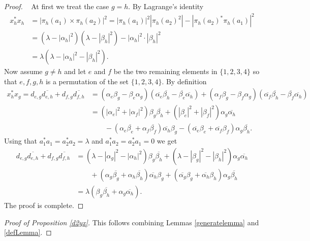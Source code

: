 \documentclass[11pt]{amsart}
\theoremstyle{definition}
\theoremstyle{remark}
\begin{document}
\begin{proof}~
At first we treat the case $g=h$. By Lagrange's identity
\begin{align*}
x_h^*x_h 
&=|\pi_h(a_1)\times \pi_h(a_2)|^2=|\pi_h(a_1)|^2|\pi_h(a_2)^2|-|\pi_h(a_2)^*\pi_h(a_1)|^2\\ &=
(\lambda-|\alpha_h|^2)(\lambda-|\beta_h|^2)-|\alpha_h|^2\cdot|\beta_h|^2\\ &=\lambda(\lambda-|\alpha_h|^2-|\beta_h|^2).
\end{align*} 
Now assume $g\neq h$ and let $e$ and $f$ be the two remaining elements in $\{1,2,3,4\}$ so that $e,f,g,h$ is a permutation of the set $\{1,2,3,4\}$. By definition
\begin{align*}
x_h^*x_g=d_{e,g}\overline{d_{e,h}}+d_{f,g}\overline{d_{f,h}}&=
(\alpha_e\beta_g-\beta_e\alpha_g)(\overline{\alpha_e}\overline{\beta_h}-\overline{\beta_e}\overline{\alpha_h})+(\alpha_f\beta_g-\beta_f\alpha_g)(\overline{\alpha_f}\overline{\beta_h}-\overline{\beta_f}\overline{\alpha_h})\\ &=
(|\alpha_e|^2+|\alpha_f|^2)\beta_g\overline{\beta_h}+(|\beta_e|^2+|\beta_f|^2)\alpha_g\overline{\alpha_h}\\ & \qquad -(\alpha_e\overline{\beta_e}+\alpha_f\overline{\beta_f})\overline{\alpha_h}\beta_g-(\overline{\alpha_e}\beta_e+\overline{\alpha_f}\beta_f)\alpha_g\overline{\beta_h}.
\end{align*}
Using that $a_1^*a_1=a_2^*a_2=\lambda$ and $a_1^*a_2=a_2^*a_1=0$ we get
\begin{align*}
d_{e,g}\overline{d_{e,h}}+d_{f,g}\overline{d_{f,h}}&=
(\lambda-|\alpha_g|^2-|\alpha_h|^2)\beta_g\overline{\beta_h}+(\lambda-|\beta_g|^2-|\beta_h|^2)\alpha_g\overline{\alpha_h}\\
&\qquad +(\alpha_g\overline{\beta_g}+\alpha_h\overline{\beta_h})\overline{\alpha_h}\beta_g+(\overline{\alpha_g}\beta_g+\overline{\alpha_h}\beta_h)\alpha_g\overline{\beta_h} \\ &=
\lambda(\beta_g\overline{\beta_h}+\alpha_g\overline{\alpha_h}).
\end{align*}
The proof is complete.
\end{proof}

\begin{proof}[Proof of Proposition \ref{d2yx}]
This follows combining Lemmas \ref{generatelemma} and \ref{defLemma}.
\end{proof}
\end{document}
